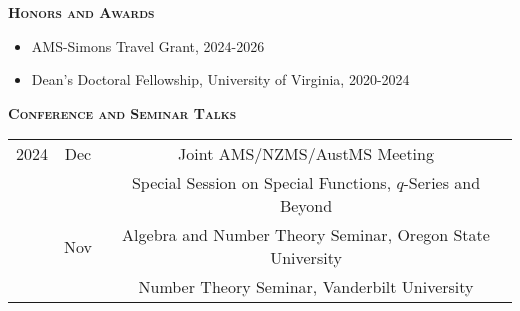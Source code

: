 \documentclass[11pt]{amsart}
\theoremstyle{remark}
\begin{document}
{{{\vspace{.1in}

\newpage

\large{\textbf{\textsc{Honors and Awards}}}

\begin{itemize}
\item AMS-Simons Travel Grant, 2024-2026
\item Dean's Doctoral Fellowship, University of Virginia, 2020-2024
\end{itemize}

\vspace{.1in}

\large{\textbf{\textsc{Conference and Seminar Talks}}}


 
\bgroup
\def\arraystretch{1.6}
\begin{tabular}{ c c c }
2024 & Dec & \hspace{-3.45in} Joint AMS/NZMS/AustMS Meeting \\
&& \hspace{-1.89in} Special Session on Special Functions, $q$-Series and Beyond\\

& Nov & \hspace{-1.48in} Algebra and Number Theory Seminar, Oregon State University\\

&& \hspace{-2.58in} Number Theory Seminar, Vanderbilt University\\


\end{tabular}}}}
\end{document}
